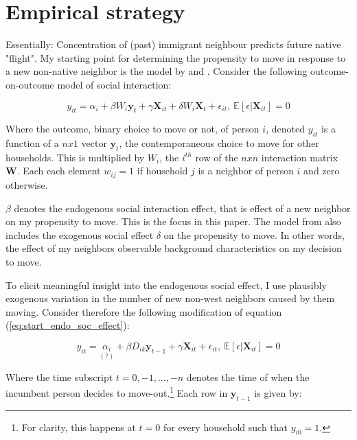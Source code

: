 \documentclass[../main.tex]{subfiles}
\begin{document}
\section{Empirical strategy}
\label{sec:empirical_strategy}
Essentially: Concentration of (past) immigrant neighbour predicts future native "flight". My starting point for determining the propensity to move in response to a new non-native neighbor is the model by \textcite{bramoulle2009_peer_effects} and \textcite{bouncing_with_the_joneses_grenestam}. Consider the following outcome-on-outcome model of social interaction:

\begin{equation}
    y_{it} = \alpha_i + \beta W_i \mathbf{y}_t + \gamma \mathbf{X}_{it} + \delta W_i \mathbf{X}_t + \epsilon_{it},~\mathbb{E}[\epsilon | \mathbf{X}_{it}] = 0
\label{eq:start_endo_soc_effect}
\end{equation}

Where the outcome, binary choice to move or not, of person $i$, denoted $y_{it}$ is a function of a $n x 1$ vector $\mathbf{y}_t$, the contemporaneous choice to move for other households. This is multiplied by $W_i$, the $i^{th}$ row of the $n x n$ interaction matrix $\mathbf{W}$. Each each element $w_{ij}=1$ if household $j$ is a neighbor of person $i$ and zero otherwise.

$\beta$ denotes the endogenous social interaction effect, that is effect of a new neighbor on my propensity to move. This is the focus in this paper. The model from \textcite{bramoulle2009_peer_effects} also includes the exogenous social effect $\delta$ on the propensity to move. In other words, the effect of my neighbors observable background characteristics on my decision to move. 

To elicit meaningful insight into the endogenous social effect, I use plausibly exogenous variation in the number of new non-west neighbors caused by them moving. Consider therefore the following modification of equation (\ref{eq:start_endo_soc_effect}):

\begin{equation}
    y_{it} = \underset{(?)}{\alpha_i} + \beta D_{ik} \mathbf{y}_{t-1} + \gamma \mathbf{X}_{it} + \epsilon_{it},~\mathbb{E}[\epsilon | \mathbf{X}_{it}] = 0
\label{eq:spec1_endo_soc_effect}
\end{equation}

Where the time subscript $t=0, -1, ..., -n$ denotes the time of when the incumbent person decides to move-out.\footnote{For clarity, this happens at $t=0$ for every household such that $y_{i0}=1$.} Each row in $\mathbf{y}_{t-1}$ is given by:
\end{document}
